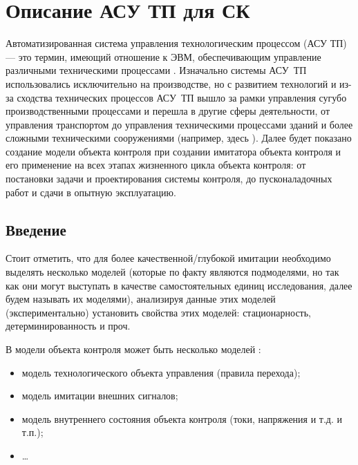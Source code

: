 \chapter{Описание АСУ ТП для СК}\label{ch:chn}


Автоматизированная система управления технологическим процессом (АСУ ТП) --- это термин,
имеющий отношение к ЭВМ, обеспечивающим управление различными техническими процессами \cite{journal:iter_research_guriev_2016}.
Изначально системы АСУ~ТП использовались исключительно на производстве, но с развитием технологий
и из-за сходства технических процессов АСУ~ТП вышло за рамки управления сугубо производственными процессами
и перешла в другие сферы деятельности, от управления транспортом %
до управления техническими процессами зданий \cite{journal:vechisl_tech:2013:Golushko}
и более сложными техническими сооружениями (например, здесь \cite{journal:vechisl_tech:2004_okolnischnikov}).
%
Далее будет показано создание  модели объекта контроля
при создании имитатора объекта контроля и его применение на всех этапах жизненного цикла
объекта контроля: от постановки задачи и проектирования системы контроля, до пусконаладочных работ
и сдачи в опытную эксплуатацию.

\section{Введение}


Стоит отметить, что для более качественной/глубокой имитации необходимо выделять несколько моделей
(которые по факту являются подмоделями, но так как они могут выступать в качестве самостоятельных единиц исследования,
далее будем называть их моделями),
анализируя данные этих моделей (экспериментально) установить свойства этих моделей:
стационарность, детерминированность и проч.

В модели объекта контроля может быть несколько моделей \cite{journal:vechisl_tech:2004_okolnischnikov}:
\begin{itemize}
    \item модель технологического объекта управления (правила перехода);
    \item модель имитации внешних сигналов;
    \item модель внутреннего состояния объекта контроля (токи, напряжения и т.д. и т.п.);
    \item \ldots
\end{itemize}

